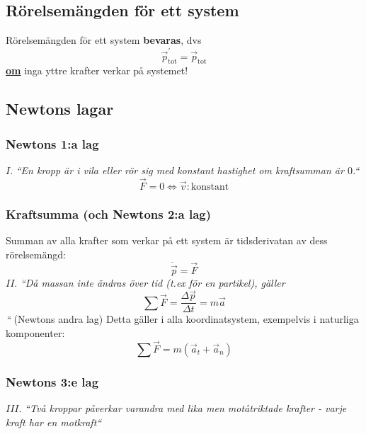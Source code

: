 \documentclass{article}
\newenvironment{ankiflashcard}[1]{}{}
\begin{document}
\begin{paracol}{2}
\begin{ankiflashcard}{Vad är sant om rörelsemängdslagen för ett system?}
\subsection{Rörelsemängden för ett system}
Rörelsemängden för ett system \textbf{bevaras}, dvs
$$\vec p_{\text{tot}}^{\prime} = \vec p_{\text{tot}}$$ \underline{\textbf{om}} inga yttre krafter verkar på systemet!
\end{ankiflashcard}

\subsection{Newtons lagar}
\begin{ankiflashcard}{Vad säger Newtons första lag?}
    
\subsubsection{Newtons 1:a lag}
$I.$ \textit{``En kropp är i vila eller rör sig med konstant hastighet om kraftsumman är $0$.``}
$$\vec F = 0 \iff \vec v: \text{konstant}$$
\end{ankiflashcard}

\begin{ankiflashcard}{Forumlera Newtons andra lag}
\subsubsection{Kraftsumma (och Newtons 2:a lag)}
Summan av alla krafter som verkar på ett system är tidsderivatan av dess rörelsemängd:
$$\dot{\vec p} = \vec F$$
$II.$ \textit{``Då massan inte ändras över tid (t.ex för en partikel), gäller
$$\sum \vec F= \frac{\Delta \vec p}{\Delta t} = m\vec a$$``}
(Newtons andra lag)
Detta gäller i alla koordinatsystem, exempelvis i naturliga komponenter:
$$\sum \vec F = m(\vec a_t + \vec a_n)$$
\end{ankiflashcard}
\begin{ankiflashcard}{Formulera Newtons tredje lag}
\subsubsection{Newtons 3:e lag}
$III.$ \textit{``Två kroppar påverkar varandra med lika men motåtriktade krafter - varje kraft har en motkraft``}
\end{ankiflashcard}


\end{paracol}
\end{document}
